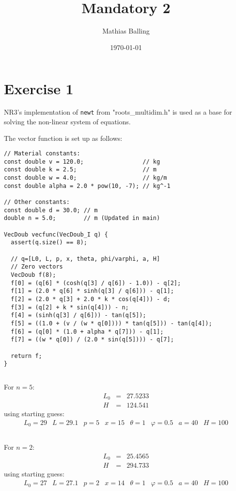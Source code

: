 \documentclass{article}
\title{Mandatory 2}
\author{Mathias Balling}
\date{\today}
\begin{document}
\maketitle

\section{Exercise 1}
NR3's implementation of \texttt{newt} from "roots\_multidim.h" is used as a base for solving the non-linear system of equations.

The vector function is set up as follows:
\begin{verbatim}
// Material constants:
const double v = 120.0;                 // kg
const double k = 2.5;                   // m
const double w = 4.0;                   // kg/m
const double alpha = 2.0 * pow(10, -7); // kg^-1

// Other constants:
const double d = 30.0; // m
double n = 5.0;        // m (Updated in main)

VecDoub vecfunc(VecDoub_I q) {
  assert(q.size() == 8);

  // q=[L0, L, p, x, theta, phi/varphi, a, H]
  // Zero vectors
  VecDoub f(8);
  f[0] = (q[6] * (cosh(q[3] / q[6]) - 1.0)) - q[2];
  f[1] = (2.0 * q[6] * sinh(q[3] / q[6])) - q[1];
  f[2] = (2.0 * q[3] + 2.0 * k * cos(q[4])) - d;
  f[3] = (q[2] + k * sin(q[4])) - n;
  f[4] = (sinh(q[3] / q[6])) - tan(q[5]);
  f[5] = ((1.0 + (v / (w * q[0]))) * tan(q[5])) - tan(q[4]);
  f[6] = (q[0] * (1.0 + alpha * q[7])) - q[1];
  f[7] = ((w * q[0]) / (2.0 * sin(q[5]))) - q[7];

  return f;
}
\end{verbatim}

\subsection{}
For $n=5$:
$$
\begin{array}{ccc}
  L_0 & = & 27.5233 \\
  H & = & 124.541
\end{array}
$$
using starting guess:
$$
\begin{array}{cccccccc}
L_0 = 29 & L = 29.1 & p = 5 & x = 15 & \theta  = 1 & \varphi = 0.5 & a = 40 & H = 100
\end{array}
$$

\subsection{}
For $n=2$:
$$
\begin{array}{ccc}
  L_0 & = & 25.4565 \\
  H & = & 294.733
\end{array}
$$
using starting guess:
$$
\begin{array}{cccccccc}
L_0 = 27 & L = 27.1 & p = 2 & x = 14 & \theta  = 1 & \varphi = 0.5 & a = 40 & H = 100
\end{array}
$$
\end{document}
